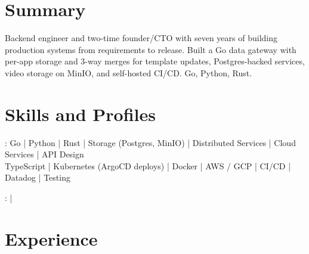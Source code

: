 \documentclass[print]{jack-resume}
\begin{document}
\pagecolor{darkmodeBackground}


\begin{minipage}[t][1cm][t]{.03\textwidth}
    \hfill
\end{minipage}

\section{Summary}
Backend engineer and two-time founder/CTO with seven years of building production systems from requirements to release. Built a Go data gateway with per-app storage and 3-way merges for template updates, Postgres-backed services, video storage on MinIO, and self-hosted CI/CD. Go, Python, Rust.
\sectionsep

\section{Skills and Profiles}
:
Go \hfill | \hfill
Python \hfill | \hfill
Rust \hfill | \hfill
Storage (Postgres, MinIO) \hfill | \hfill
Distributed Services \hfill | \hfill
Cloud Services \hfill | \hfill
API Design \\
\hspace{1.0cm} TypeScript \hfill | \hfill
Kubernetes (ArgoCD deploys) \hfill | \hfill
Docker \hfill | \hfill
AWS / GCP \hfill | \hfill
CI/CD \hfill | \hfill
Datadog \hfill | \hfill
Testing \\

\raggedright{
    :
      \href{https://www.linkedin.com/in/jack-sturtevant/}{ \ExternalLink} |
     \href{https://github.com/jacksturt}{ \ExternalLink}}

\section{Experience}
\end{document}
